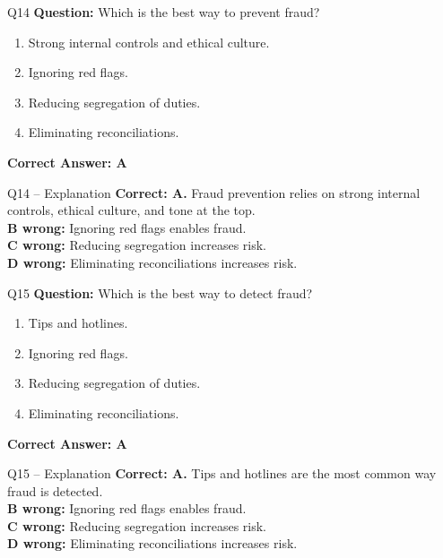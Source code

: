 \documentclass[aspectratio=169,10pt]{beamer}
\begin{document}
	\begin{frame}[t]{Q14}
		\small
		\textbf{Question:} Which is the best way to prevent fraud?
		\begin{enumerate}[label=\Alph*.,itemsep=1pt,topsep=2pt]
			\item Strong internal controls and ethical culture.
			\item Ignoring red flags.
			\item Reducing segregation of duties.
			\item Eliminating reconciliations.
		\end{enumerate}
		\vspace{4pt}
		\textbf{Correct Answer: A}
	\end{frame}
	
	\begin{frame}[t]{Q14 -- Explanation}
		\small
		\textbf{Correct: A.} Fraud prevention relies on strong internal controls, ethical culture, and tone at the top. \\[4pt]
		\textbf{B wrong:} Ignoring red flags enables fraud. \\[2pt]
		\textbf{C wrong:} Reducing segregation increases risk. \\[2pt]
		\textbf{D wrong:} Eliminating reconciliations increases risk.
	\end{frame}
	
	\begin{frame}[t]{Q15}
		\small
		\textbf{Question:} Which is the best way to detect fraud?
		\begin{enumerate}[label=\Alph*.,itemsep=1pt,topsep=2pt]
			\item Tips and hotlines.
			\item Ignoring red flags.
			\item Reducing segregation of duties.
			\item Eliminating reconciliations.
		\end{enumerate}
		\vspace{4pt}
		\textbf{Correct Answer: A}
	\end{frame}
	
	\begin{frame}[t]{Q15 -- Explanation}
		\small
		\textbf{Correct: A.} Tips and hotlines are the most common way fraud is detected. \\[4pt]
		\textbf{B wrong:} Ignoring red flags enables fraud. \\[2pt]
		\textbf{C wrong:} Reducing segregation increases risk. \\[2pt]
		\textbf{D wrong:} Eliminating reconciliations increases risk.
	\end{frame}
	
\end{document}
